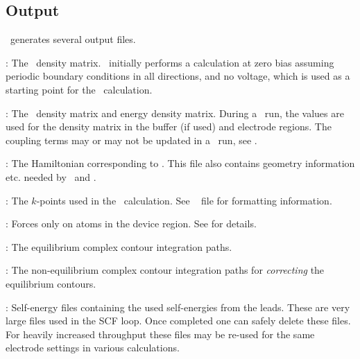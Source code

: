\subsection{Output}

\tsiesta\ generates several output files.  
\begin{description}
  \itemsep 10pt
  \parsep 0pt
  
  \item[\sysfile{DM}]: The \siesta\ density matrix. \siesta\ initially
  performs a calculation at zero bias assuming periodic boundary conditions in all
  directions, and no voltage, which is used as a starting point for the \tsiesta\
  calculation.
  
  \item[\sysfile{TSDE}]: The \tsiesta\ density matrix and energy
  density matrix. During a \tsiesta\ run, the \sysfile{DM} values are
  used for the density matrix in the buffer (if used) and electrode
  regions. The coupling terms may or may not be updated in a \tsiesta\
  run, see .
  
  \item[\sysfile{TSHS}]: The Hamiltonian corresponding to
  . This file also contains geometry information
  etc. needed by \tsiesta\ and \tbtrans.

  \item[\sysfile{TS.KP}]: The $k$-points used in the \tsiesta\ calculation. See
  \siesta\  file for formatting information.

  \item[\sysfile{TSFA}]: Forces only on atoms in the device
  region. See  for details.

  \item[\sysfile{TSCCEQ*}]: The equilibrium complex contour integration paths.

  \item[\sysfile{TSCCNEQ*}]: The non-equilibrium complex contour
  integration paths for \emph{correcting} the equilibrium contours.

  \item[\sysfile{TSGF*}]: Self-energy files containing the used
  self-energies from the leads. These are very large files used in the
  SCF loop. Once completed one can safely delete these files.
  For heavily increased throughput these files may be re-used for the
  same electrode settings in various calculations.

\end{description} 

